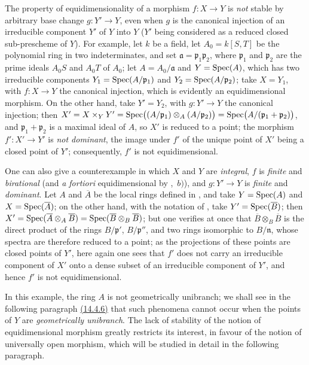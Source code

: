 \begin{remarks}[13.3.9]
\label{IV.13.3.9}
The property of equidimensionality of a morphism $f:X\to Y$ is \emph{not} stable by arbitrary base change $g:Y'\to Y$, even when $g$ is the canonical injection of an irreducible component $Y'$ of $Y$ into $Y$ ($Y'$ being
considered as a reduced closed sub-prescheme of $Y$).
For example, let $k$ be a field, let $A_0=k[S,T]$ be the polynomial ring in two indeterminates, and set $\mathfrak{a}=\mathfrak{p}_1\mathfrak{p}_2$, where $\mathfrak{p}_1$ and $\mathfrak{p}_2$ are the prime ideals $A_0S$ and $A_0T$ of $A_0$; let $A=A_0/\mathfrak{a}$ and $Y=\operatorname{Spec}(A)$, which has two irreducible components $Y_1=\operatorname{Spec}(A/\mathfrak{p}_1)$ and $Y_2=\operatorname{Spec}(A/\mathfrak{p}_2)$; take $X=Y_1$, with $f:X\to Y$ the canonical injection, which is evidently an equidimensional morphism.
On the other hand, take $Y'=Y_2$, with $g:Y'\to Y$ the canonical injection; then $X'=X\times_Y Y'=\operatorname{Spec}\bigl((A/\mathfrak{p}_1)\otimes_A(A/\mathfrak{p}_2)\bigr)=\operatorname{Spec}\bigl(A/(\mathfrak{p}_1+\mathfrak{p}_2)\bigr)$, and $\mathfrak{p}_1+\mathfrak{p}_2$ is a maximal ideal of $A$, so $X'$ is reduced to a point; the morphism $f':X'\to Y'$ is \emph{not dominant}, the image under $f'$ of the unique point of $X'$ being a closed point of $Y'$; consequently, $f'$ is not equidimensional.

One can also give a counterexample in which $X$ and $Y$ are \emph{integral}, $f$ is \emph{finite} and \emph{birational} (and \emph{a fortiori} equidimensional by ,~$b)$), and $g:Y'\to Y$ is \emph{finite} and \emph{dominant}.
Let $A$ and $\overline{A}$ be the local rings defined in , and take $Y=\operatorname{Spec}(A)$ and $X=\operatorname{Spec}(\overline{A})$; on the other hand, with the notation of , take $Y'=\operatorname{Spec}(\overline{B})$; then $X'=\operatorname{Spec}(\overline{A}\otimes_A\overline{B})=\operatorname{Spec}(\overline{B}\otimes_B\overline{B})$; but one verifies at once that $\overline{B}\otimes_B\overline{B}$ is the direct product of the rings $B/\mathfrak{p}'$, $B/\mathfrak{p}''$, and two rings isomorphic to $B/\mathfrak{n}$, whose spectra are therefore reduced to a point; as the projections of these points are closed points of $Y'$, here again one sees that $f'$ does not carry an irreducible component of $X'$ onto a dense subset of an irreducible component of $Y'$, and hence $f'$ is not equidimensional.

In this example, the ring $A$ is not geometrically unibranch; we shall see in the following paragraph {\hyperref[IV.14.4.6]{(14.4.6)}} that such phenomena cannot occur when the points of $Y$ are \emph{geometrically unibranch}.
The lack of stability of the notion of equidimensional morphism greatly restricts its interest, in favour of the notion of universally open morphism, which will be studied in detail in the following paragraph.
\end{remarks}
